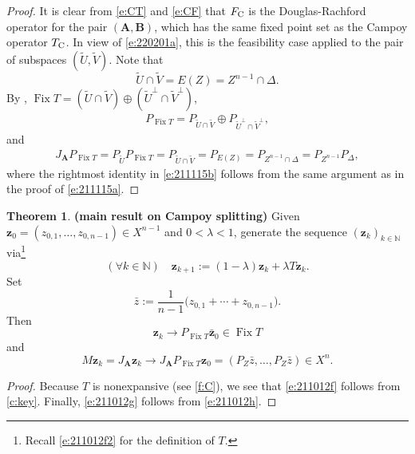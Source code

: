 \documentclass[11pt]{article}
\newcommand{\bz}{\ensuremath{\mathbf{z}}}
\newcommand{\kkk}{\ensuremath{{k\in{\mathbb N}}}}
\newcommand{\Fix}{\ensuremath{\operatorname{Fix}}}
\newcommand{\tc}{\ensuremath{T_{\text{\scriptsize C}}}}
\newcommand{\fc}{\ensuremath{F_{\text{\scriptsize C}}}}
\newcommand{\bA}{\ensuremath{{\mathbf{A}}}}
\newcommand{\bB}{\ensuremath{{\mathbf{B}}}}
\theoremstyle{definition}
\newtheorem{theorem}{Theorem}[section]
\begin{document}
{\begin{proof}
It is clear from \cref{e:CT} and \cref{e:CF} that $\fc$ is the Douglas-Rachford operator
for the pair $(\bA,\bB)$, which has the same fixed point set as the Campoy operator $\tc$. 
In view of \cref{e:220201a}, this is the feasibility case applied to the
pair of subspaces $(\widetilde{U},\widetilde{V})$. 
Note that
\begin{equation}
\label{e:211012e}
\widetilde{U}\cap \widetilde{V} = E(Z) = Z^{n-1}\cap \Delta. 
\end{equation}
By \cite[Proposition~3.6]{BBCNPW1}, 
$\Fix T = (\widetilde{U}\cap \widetilde{V})\oplus 
({\widetilde{U}}^\perp \cap {\widetilde{V}}^\perp)$, 
\begin{align}
\label{e:CPFixT}
P_{\Fix T}= P_{\widetilde{U}\cap \widetilde{V}} 
\oplus P_{{\widetilde{U}}^\perp \cap {\widetilde{V}}^\perp},
\end{align}
and 
\begin{align}\label{e:211115b}
J_{\bA}P_{\Fix T} = P_{\widetilde{U}}P_{\Fix T} = 
P_{\widetilde{U}\cap \widetilde{V}}=P_{E(Z)} = P_{Z^{n-1}\cap \Delta} 
= P_{Z^{n-1}}P_\Delta,
\end{align}
where the rightmost identity in \cref{e:211115b}
follows 
from the same argument as in the proof of \cref{e:211115a}. 
\end{proof}


\begin{theorem} {\bf (main result on Campoy splitting)}
Given $\bz_0=(z_{0,1},\ldots,z_{0,n-1}) \in X^{n-1}$ and
$0<\lambda<1$, 
generate the sequence $(\bz_k)_\kkk$ via\footnote{Recall \cref{e:211012f2} 
for the definition of $T$.}
\begin{equation*}
(\forall\kkk)\quad
\bz_{k+1} := (1-\lambda)\bz_k + \lambda T\bz_k.
\end{equation*}
Set 
\begin{equation*}
\bar{z} := \frac{1}{n-1}\big(z_{0,1}+\cdots+z_{0,n-1}\big). 
\end{equation*}
Then 
\begin{equation}
\label{e:211012f}
{\bz}_k \to P_{\Fix T}\bar{\bz}_0 \in \Fix T
\end{equation}
and 
\begin{equation}
\label{e:211012g}
M\bz_k = J_{\bA}\bz_k \to J_{\bA}P_{\Fix T}{\bz}_0 = (P_Z\bar{z},\ldots,P_Z\bar{z}) \in X^n. 
\end{equation}
\end{theorem}
\begin{proof}
Because $T$ is nonexpansive (see \cref{f:C}), we see that 
\cref{e:211012f} follows from \cref{c:key}. 
Finally, \cref{e:211012g} follows from \cref{e:211012h}. 
\end{proof}


}
\end{document}
